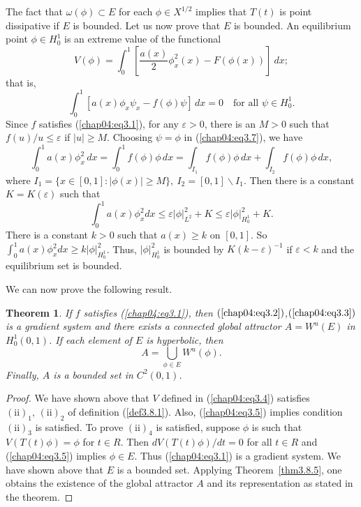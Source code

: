 \documentclass{surv-l}
\theoremstyle{plain}
\newtheorem{theorem}{Theorem}[section]
\theoremstyle{definition}
\numberwithin{equation}{section}
\numberwithin{figure}{chapter}
\begin{document}
The fact that $\omega(\phi)\subset E$ for each $\phi\in X^{1/2}$ implies that $T(t)$ is point dissipative if $E$ is bounded. Let us now prove that $E$ is bounded. An equilibrium point $\phi\in H_{0}^{1}$ is an extreme value of the functional
\begin{equation*}
V(\phi)=\int_{0}^{1}\left[\frac{a(x)}{2}\phi_{x}^{2}(x)-F(\phi(x))\right]\ dx;
\end{equation*}
that is,
\begin{equation}\label{chap04:eq3.7}
\int_{0}^{1}[a(x)\phi_{x}\psi_{x}-f(\phi)\psi]\,dx=0\quad \text{for all } \psi\in H_{0}^{1}.
\end{equation}
Since $f$ satisfies (\ref{chap04:eq3.1}), for any $\varepsilon>0$, there is an $M>0$ such that $ f(u)/u\leq\varepsilon$ if $|u|\geq M$. Choosing $\psi=\phi$ in (\ref{chap04:eq3.7}), we have
\begin{equation*}
\int_{0}^{1}a(x)\phi_{x}^{2}\,dx=\int_{0}^{1}f(\phi)\phi\, dx=\int_{I_{1}}f(\phi)
\phi\, dx+\int_{I_{2}}f(\phi)\phi\, dx,
\end{equation*}
where $I_{1}=\{x\in[0,1]\!:|\phi(x)|\geq M\},\ I_{2}=[0,1]\backslash I_{1}$. Then there is a constant $K=K(\varepsilon)$ such that
\begin{equation*}
\int_{0}^{1}a(x)\phi_{x}^{2}dx\leq\varepsilon|\phi|_{L^{2}}^{2}+K\leq\varepsilon|\phi|_{H_{0}^{1}}^{2}+K.
\end{equation*}
There is a constant $k>0$ such that $a(x)\geq k$ on $[0,1]$. So
$\int_{0}^{1}a(x)\phi_{x}^{2}dx\geq k|\phi|_{H_{0}^{1}}^{2}$. Thus, $|\phi|_{H_{0}^{1}}^{2}$ is bounded by $K(k-\varepsilon)^{-1}$ if $\varepsilon<k$ and the equilibrium set is bounded.

We can now prove the following result.

\begin{theorem}\label{thm4.3.1}
If $f$ satisfies \emph{(\ref{chap04:eq3.1})}, then $(\ref{chap04:eq3.2})$,$(\ref{chap04:eq3.3})$ is a gradient system and there exists a connected global attractor $A=W^{u}(E)$ in $H_{0}^{1}(0,1)$. If each element of $E$ is hyperbolic, then
\begin{equation*}
A=\bigcup_{\phi\in E}W^{u}(\phi).
\end{equation*}
Finally, $A$ is a bounded set in $C^{2}(0,1)$.
\end{theorem}
\begin{proof}
We have shown above that $V$ defined in (\ref{chap04:eq3.4}) satisfies $(\mathrm{ii})_{1},\,(\mathrm{ii})_{2}$ of definition (\ref{def3.8.1}). Also, (\ref{chap04:eq3.5}) implies condition $(\mathrm{ii})_{3}$ is satisfied. To prove $(\mathrm{ii})_{4}$ is satisfied, suppose $\phi$ is such that $ V(T(t)\phi)=\phi$ for $t\in R$. Then $dV(T(t)\phi)/dt=0$ for all $t\in R$ and (\ref{chap04:eq3.5}) implies $\phi\in E$. Thus (\ref{chap04:eq3.1}) is a gradient system. We have shown above that $E$ is a bounded set. Applying Theorem~\ref{thm3.8.5}, one obtains the existence of the
 global attractor $A$ and its representation as stated in the theorem.
\end{proof}
\end{document}
